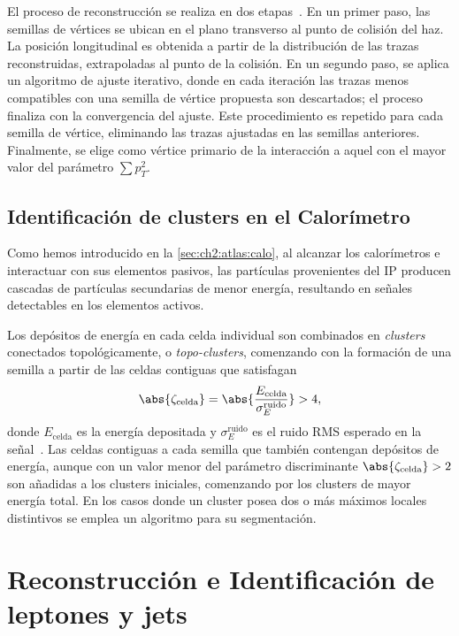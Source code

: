 El proceso de reconstrucción se realiza en dos etapas~\cite{Meloni2016,Boutle2017,ATL-PHYS-PUB-2015-026}. En un primer paso, las semillas de vértices se ubican en el plano transverso al punto de colisión del haz. La posición longitudinal es obtenida a partir de la distribución de las trazas reconstruidas, extrapoladas al punto de la colisión. En un segundo paso, se aplica un algoritmo de ajuste iterativo, donde en cada iteración las trazas menos compatibles con una semilla de vértice propuesta son descartados; el proceso finaliza con la convergencia del ajuste. Este procedimiento es repetido para cada semilla de vértice, eliminando las trazas ajustadas en las semillas anteriores. Finalmente, se elige como vértice primario de la interacción a aquel con el mayor valor del parámetro $\sum p_T^2$.


\subsection{Identificación de clusters en el Calorímetro}

Como hemos introducido en la \cref{sec:ch2:atlas:calo}, al alcanzar los calorímetros e interactuar con sus elementos pasivos, las partículas provenientes del IP producen cascadas de partículas secundarias de menor energía, resultando en señales detectables en los elementos activos.

Los depósitos de energía en cada celda individual son combinados en \textit{clusters} conectados topológicamente, o \textit{topo-clusters}, comenzando con la formación de una semilla a partir de las celdas contiguas que satisfagan
\[ \abs{\zeta_{\text{celda}}} = \abs{\frac{E_{\text{celda}}}{\sigma_{E}^{\text{ruido}}}} > 4, \]
donde $E_{\text{celda}}$ es la energía depositada y $\sigma_{E}^{\text{ruido}}$ es el ruido RMS esperado en la señal~\cite{Benslama2008}. Las celdas contiguas a cada semilla que también contengan depósitos de energía, aunque con un valor menor del parámetro discriminante $\abs{\zeta_{\text{celda}}} > 2$ son añadidas a los clusters iniciales, comenzando por los clusters de mayor energía total. En los casos donde un cluster posea dos o más máximos locales distintivos se emplea un algoritmo para su segmentación.




\section[Reconstrucción en Identificación de leptones y jets]{Reconstrucción e Identificación de \\ leptones y jets}

